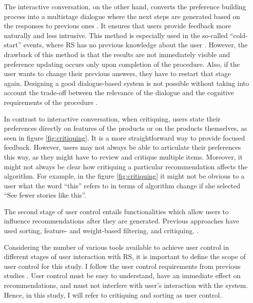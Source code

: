 \documentclass[a4paper,12pt]{article}
\begin{document}
The interactive conversation, on the other hand, converts the preference building process into a multistage dialogue where the next steps are generated based on the responses to previous ones \citep{he2016interactive}. It ensures that users provide feedback more naturally and less intrusive. This method is especially used in the so-called ``cold-start'' events, where RS has no previous knowledge about the user \citep{guAddressingColdStartProblem2019}. However, the drawback of this method is that the results are not immediately visible and preference updating occurs only upon completion of the procedure. Also, if the user wants to change their previous answers, they have to restart that stage again. Designing a good dialogue-based system is not possible without taking into account the trade-off between the relevance of the dialogue and the cognitive requirements of the procedure \citep{Gao_2021}. 

In contrast to interactive conversation, when critiquing, users state their preferences directly on features of the products or on the products themselves, as seen in figure \ref{fig:critiquing}. It is a more straightforward way to provide focused feedback. However, users may not always be able to articulate their preferences this way, as they might have to review and critique multiple items. Moreover, it might not always be clear how critiquing a particular recommendation affects the algorithm. For example, in the figure \ref{fig:critiquing} it might not be obvious to a user what the word ``this'' refers to in terms of algorithm change if she selected ``See fewer stories like this''.

The second stage of user control entails functionalities which allow users to influence recommendations after they are generated. Previous approaches have used sorting, feature- and weight-based filtering, and critiquing. \citep{swearingen2001beyond, schafer2002meta, bostandjiev2012tasteweights, schaffer2015hypothetical, jannach2017user}. 

Considering the number of various tools available to achieve user control in different stages of user interaction with RS, it is important to define the scope of user control for this study. I follow the user control requirements from previous studies \citep{jannach2017user}. User control must be easy to understand, have an immediate effect on recommendations, and must not interfere with user's interaction with the system. Hence, in this study, I will refer to critiquing and sorting as user control. 
\end{document}
